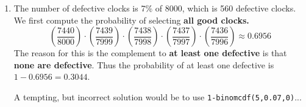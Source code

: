 \documentclass{article}
\begin{document}
\begin{enumerate}
\begin{enumerate}
    \end{enumerate}
    
\item The number of defective clocks is 7\% of 8000, which is 560 defective clocks. We first compute the probability of selecting \textbf{all good clocks.}
$$\left(\frac{7440}{8000}\right)\cdot\left(\frac{7439}{7999}\right)\cdot\left(\frac{7438}{7998}\right)\cdot\left(\frac{7437}{7997}\right)\cdot\left(\frac{7436}{7996}\right)\approx 0.6956$$
The reason for this is the complement to \textbf{at least one defective} is that \textbf{none are defective}. Thus the probability of at least one defective is $1-0.6956=0.3044$.

A tempting, but incorrect solution would be to use \texttt{1-binomcdf(5,0.07,0)}...
\end{enumerate}
\end{document}
